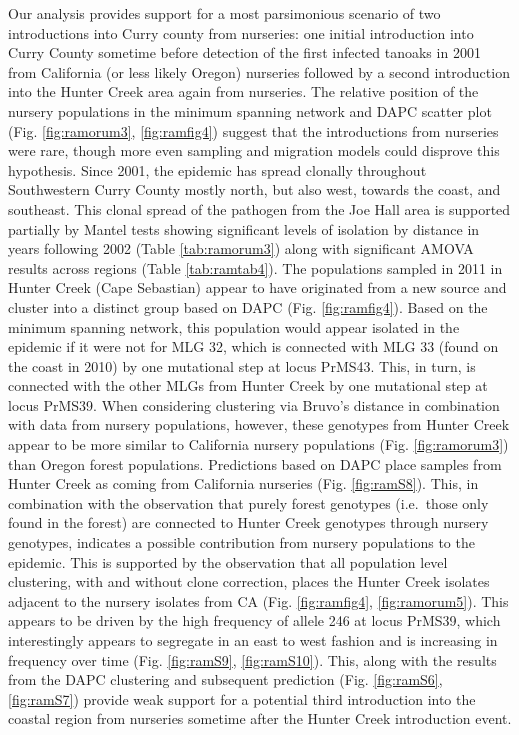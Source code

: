 \documentclass[double,11pt]{beavtex}
\begin{document}
  Our analysis provides support for a most parsimonious scenario of two
  introductions into Curry county from nurseries: one initial introduction
  into Curry County sometime before detection of the first infected
  tanoaks in 2001 from California (or less likely Oregon) nurseries
  followed by a second introduction into the Hunter Creek area again from
  nurseries. The relative position of the nursery populations in the
  minimum spanning network and DAPC scatter plot (Fig. \ref{fig:ramorum3},
  \ref{fig:ramfig4}) suggest that the introductions from nurseries were
  rare, though more even sampling and migration models could disprove this
  hypothesis. Since 2001, the epidemic has spread clonally throughout
  Southwestern Curry County mostly north, but also west, towards the
  coast, and southeast. This clonal spread of the pathogen from the Joe
  Hall area is supported partially by Mantel tests showing significant
  levels of isolation by distance in years following 2002 (Table
  \ref{tab:ramorum3}) along with significant AMOVA results across regions
  (Table \ref{tab:ramtab4}). The populations sampled in 2011 in Hunter
  Creek (Cape Sebastian) appear to have originated from a new source and
  cluster into a distinct group based on DAPC (Fig. \ref{fig:ramfig4}).
  Based on the minimum spanning network, this population would appear
  isolated in the epidemic if it were not for MLG 32, which is connected
  with MLG 33 (found on the coast in 2010) by one mutational step at locus
  PrMS43. This, in turn, is connected with the other MLGs from Hunter
  Creek by one mutational step at locus PrMS39. When considering
  clustering via Bruvo's distance in combination with data from nursery
  populations, however, these genotypes from Hunter Creek appear to be
  more similar to California nursery populations (Fig. \ref{fig:ramorum3})
  than Oregon forest populations. Predictions based on DAPC place samples
  from Hunter Creek as coming from California nurseries (Fig.
  \ref{fig:ramS8}). This, in combination with the observation that purely
  forest genotypes (i.e.~those only found in the forest) are connected to
  Hunter Creek genotypes through nursery genotypes, indicates a possible
  contribution from nursery populations to the epidemic. This is supported
  by the observation that all population level clustering, with and
  without clone correction, places the Hunter Creek isolates adjacent to
  the nursery isolates from CA (Fig. \ref{fig:ramfig4},
  \ref{fig:ramorum5}). This appears to be driven by the high frequency of
  allele 246 at locus PrMS39, which interestingly appears to segregate in
  an east to west fashion and is increasing in frequency over time (Fig.
  \ref{fig:ramS9}, \ref{fig:ramS10}). This, along with the results from
  the DAPC clustering and subsequent prediction (Fig. \ref{fig:ramS6},
  \ref{fig:ramS7}) provide weak support for a potential third introduction
  into the coastal region from nurseries sometime after the Hunter Creek
  introduction event.
  
\end{document}
